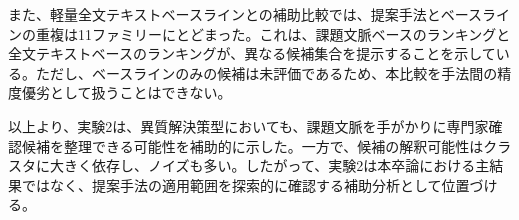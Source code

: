 また、軽量全文テキストベースラインとの補助比較では、提案手法とベースラインの重複は11ファミリーにとどまった。これは、課題文脈ベースのランキングと全文テキストベースのランキングが、異なる候補集合を提示することを示している。ただし、ベースラインのみの候補は未評価であるため、本比較を手法間の精度優劣として扱うことはできない。

以上より、実験2は、異質解決策型においても、課題文脈を手がかりに専門家確認候補を整理できる可能性を補助的に示した。一方で、候補の解釈可能性はクラスタに大きく依存し、ノイズも多い。したがって、実験2は本卒論における主結果ではなく、提案手法の適用範囲を探索的に確認する補助分析として位置づける。
